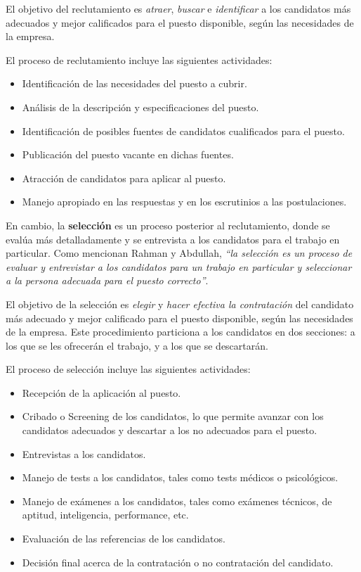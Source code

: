 \documentclass[12pt,a4paper]{article}
\begin{document}
\begin{sloppypar}
El objetivo del reclutamiento es \textit{atraer}, \textit{buscar} e \textit{identificar} a los candidatos más adecuados y mejor calificados para el puesto disponible, según las necesidades de la empresa. 

El proceso de reclutamiento incluye las siguientes actividades\cite{seleccion_reclutamiento_2}:
\begin{itemize}
\item Identificación de las necesidades del puesto a cubrir. 
\item Análisis de la descripción y especificaciones del puesto.
\item Identificación de posibles fuentes de candidatos cualificados para el puesto.
\item Publicación del puesto vacante en dichas fuentes.
\item Atracción de candidatos para aplicar al puesto.
\item Manejo apropiado en las respuestas y en los escrutinios a las postulaciones.
\end{itemize}

\cleardoublepage    %

En cambio, la \textbf{selección} es un proceso posterior al reclutamiento, donde se evalúa más detalladamente y se entrevista a los candidatos para el trabajo en particular. Como mencionan Rahman y Abdullah, \textit{``la selección es un proceso de evaluar y entrevistar a los candidatos para un trabajo en particular y seleccionar a la persona adecuada para el puesto correcto''}\cite{seleccion_reclutamiento_2}.

El objetivo de la selección es \textit{elegir} y \textit{hacer efectiva la contratación} del candidato más adecuado y mejor calificado para el puesto disponible, según las necesidades de la empresa. Este procedimiento particiona a los candidatos en dos secciones: a los que se les ofrecerán el trabajo, y a los que se descartarán.

El proceso de selección incluye las siguientes actividades\cite{seleccion_reclutamiento_2}: 
\begin{itemize}
\item Recepción de la aplicación al puesto.
\item Cribado o Screening de los candidatos, lo que permite avanzar con los candidatos adecuados y descartar a los no adecuados para el puesto.
\item Entrevistas a los candidatos.
\item Manejo de tests a los candidatos, tales como tests médicos o psicológicos. 
\item Manejo de exámenes a los candidatos, tales como exámenes técnicos, de aptitud, inteligencia, performance, etc.
\item Evaluación de las referencias de los candidatos.
\item Decisión final acerca de la contratación o no contratación del candidato.
\end{itemize}


\end{sloppypar}
\end{document}
